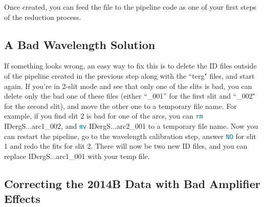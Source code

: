 \documentclass[12pt]{report}
\newcommand{\ty}[1]{\textcolor{teal}{\texttt{#1}}}
\begin{document}
\noindent Once created, you can feed the file to the pipeline code as one of your first steps of the reduction process.

\bigskip
\subsection{A Bad Wavelength Solution}
\label{badwavetran}

If something looks wrong, an easy way to fix this is to delete the ID files outside of the pipeline created in the previous step along with the ``terg" files, and start again. If you're in 2-slit mode and see that only one of the slits is bad, you can delete only the bad one of these files (either ``\_001'' for the first slit and ``\_002" for the second slit), and move the other one to a temporary file name. For example, if you find slit 2 is bad for one of the arcs, you can \ty{rm} IDergS...arc1\_002, and \ty{mv} IDergS...arc2\_001 to a temporary file name. Now you can restart the pipeline, go to the wavelength calibration step, answer \ty{NO} for slit 1 and redo the fits for slit 2. There will now be two new ID files, and you can replace IDergS...arc1\_001 with your temp file.

\bigskip
\subsection{Correcting the 2014B Data with Bad Amplifier Effects}
\label{baddata}






\end{document}
